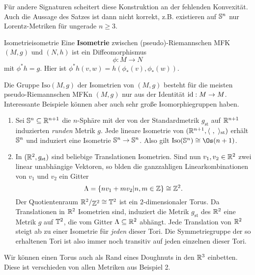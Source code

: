 \begin{bemerkung}
Für andere Signaturen scheitert diese Konstruktion an der fehlenden Konvexität. Auch die Aussage des Satzes ist dann nicht korrekt, z.B. existieren auf $\mathbb{S}^n$ nur Lorentz-Metriken für ungerade $n \geq 3$.
\end{bemerkung}
\begin{definition}{Isometrie}{isometrie}
Eine \textbf{Isometrie} zwischen (pseudo)-Riemannschen MFK $(M,g)$ und $(N,h)$ ist ein Diffeomorphismus 
\begin{equation}
\phi: M \to N
\end{equation}
mit $\phi^\ast h = g$. Hier ist $\phi^\ast h (v,w) = h(\phi_\ast (v), \phi_\ast (w))$.
\end{definition}
\begin{bemerkung}
Die Gruppe $\text{Iso}(M,g)$ der Isometrien von $(M, g)$ besteht für die meisten pseudo-Riemannschen MFKn $(M,g)$ nur aus der Identität $\text{id}: M \to M$. Interessante Beispiele können aber auch sehr große Isomorphiegruppen haben.
\end{bemerkung}
\begin{beispiele}
\begin{enumerate}
\item Sei $\mathbb{S}^n \subseteq \mathbb{R}^{n+1}$ die $n$-Sphäre mit der von der Standardmetrik $g_{\text{st}}$ auf $\mathbb{R}^{n+1}$ induzierten \textit{runden} Metrik $g$. Jede lineare Isometrie von $(\mathbb{R}^{n+1}, \langle \ , \ \rangle_\text{st})$ erhält $\mathbb{S}^n$ und induziert eine Isometrie $\mathbb{S}^n \to \mathbb{S}^n$. Also gilt $\text{Iso} (\sph^n) \cong \Os (n+1)$.
\item In $(\mathbb{R}^2, g_\text{st})$ sind beliebige Translationen Isometrien. Sind nun $v_1, v_2 \in \mathbb{R}^2$ zwei linear unabhängige Vektoren, so blden die ganzzahligen Linearkombinationen von $v_1$ und $v_2$ ein Gitter
\begin{equation}
\Lambda = \{ nv_1+mv_2 | n,m \in \mathbb{Z} \} \cong \mathbb{Z}^2.
\end{equation}
Der Quotientenraum $\quotient{\R^2}{\Z^2} \cong \T^2$ ist ein $2$-dimensionaler Torus. Da Translationen in $\mathbb{R}^2$ Isometrien sind, induziert die Metrik $g_\text{st}$ des $\mathbb{R}^2$ eine Metrik $g$ auf $\mathbb{T}^2$, die vom Gitter $\Lambda \subseteq \mathbb{R}^2$ abhängt. Jede Translation von $\mathbb{R}^2$ steigt ab zu einer Isometrie für \textit{jeden} dieser Tori. Die Symmetriegruppe der so erhaltenen Tori ist also immer noch transitiv auf jeden einzelnen dieser Tori.
\end{enumerate}
\item Wir können einen Torus auch als Rand eines Doughnuts in den $\mathbb{R}^3$ einbetten. Diese ist verschieden von allen Metriken aus Beispiel 2.
\end{beispiele}
